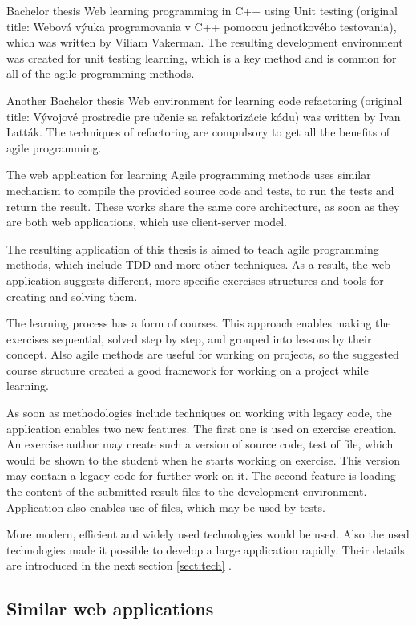 Bachelor thesis Web learning programming in C++ using Unit testing (original title: Webová výuka programovania v C++ pomocou jednotkového testovania), which was written by Viliam Vakerman. The resulting development environment was created for unit testing learning, which is a key method and is common for all of the agile programming methods. 

Another Bachelor thesis Web environment for learning code refactoring (original title: Vývojové prostredie pre učenie sa refaktorizácie kódu) was written by Ivan Latták. The techniques of refactoring are compulsory to get all the benefits of agile programming.

The web application for learning Agile programming methods uses similar mechanism to compile the provided source code and tests, to run the tests and return the result. These works share the same core architecture, as soon as they are both web applications, which use client-server model.

The resulting application of this thesis is aimed to teach agile programming methods, which include TDD and more other techniques. As a result, the web application suggests different, more specific exercises structures and tools for creating and solving them. 

The learning process has a form of courses. This approach enables making the exercises sequential, solved step by step, and grouped into lessons by their concept. Also agile methods are useful for working on projects, so the suggested course structure created a good framework for working on a project while learning.

As soon as methodologies include techniques on working with legacy code, the application enables two new features. The first one is used on exercise creation. An exercise author may create such a version of source code, test of file, which would be shown to the student when he starts working on exercise. This version may contain a legacy code for further work on it. The second feature is loading the content of the submitted result files to the development environment. Application also enables use of files, which may be used by tests.

More modern, efficient and widely used technologies would be used. Also the used technologies made it possible to develop a large application rapidly. Their details are introduced in the next section \ref{sect:tech} .

\subsection{Similar web applications}

